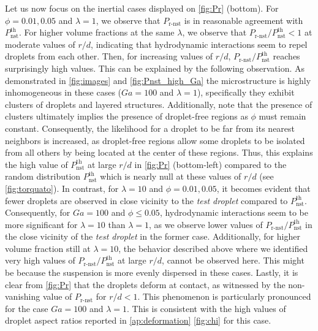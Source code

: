 Let us now focus on the inertial cases displayed on \ref{fig:Pr} (bottom). 
For $\phi = 0.01, 0.05$ and $\lambda=1$, we observe that $P_\text{r-nst}$ is in reasonable agreement with $P_\text{nst}^\text{th}$.  
For higher volume fractions at the same $\lambda$, we observe that $P_\text{r-nst}/P_\text{nst}^\text{th} < 1$ at moderate values of $r/d$,  indicating that hydrodynamic interactions seem to repel droplets from each other. 
Then, for increasing values of $r/d$, $P_\text{r-nst}/P_\text{nst}^\text{th}$ reaches surprisingly high values.  
This can be explained by the following observation. 
As demonstrated in \ref{fig:images} and \ref{fig:Pnst_high_Ga} the microstructure is highly inhomogeneous in these cases ($Ga =100$ and $\lambda =1$), specifically they exhibit clusters of droplets and layered structures.
Additionally, note that the presence of clusters ultimately implies the presence of droplet-free regions as $\phi$ must remain constant. 
Consequently, the likelihood for a droplet to be far from its nearest neighbors is increased, as droplet-free regions allow some droplets to be isolated from all others by being located at the center of these regions.
Thus, this explains the high value of $P_\text{nst}^\text{th}$ at large $r/d$ in \ref{fig:Pr} (bottom-left) compared to the random distribution $P_\text{nst}^\text{th}$ which is nearly null at these values of $r/d$ (see \ref{fig:torquato}). 
In contrast, for  $\lambda = 10$ and $\phi=0.01,0.05$, it becomes evident that fewer droplets are observed in close vicinity to the \textit{test droplet} compared to $P_\text{nst}^\text{th}$. 
Consequently, for $Ga = 100$ and $\phi \le 0.05$, hydrodynamic interactions seem to be more significant for $\lambda=10$ than $\lambda=1$, as we observe lower values of $P_\text{r-nst}/P_\text{nst}^\text{th}$ in the close vicinity of the \textit{test droplet} in the former case.
Additionally, for higher volume fraction still at $\lambda = 10$, the behavior described above where we identified very high values of $P_\text{r-nst}/P_\text{nst}^\text{th}$ at large $r/d$, cannot be observed here.
This might be because the suspension is more evenly dispersed in these cases.  
Lastly, it is clear from \ref{fig:Pr} that the droplets deform at contact, as witnessed by the non-vanishing value of $P_\text{r-nst}$ for $r/d<1$.
This phenomenon is particularly pronounced for the case $Ga = 100$ and $\lambda =1$. 
This is consistent with the high values of droplet aspect ratios reported in \ref{ap:deformation} \ref{fig:chi} for this case.



